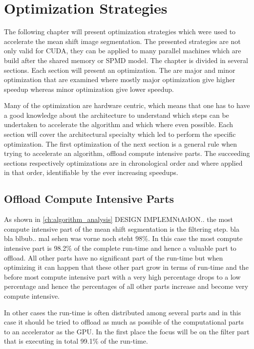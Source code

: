 \chapter{Optimization Strategies}
\label{ch:optimization}

The following chapter will present optimization strategies which were used to
accelerate the mean shift image segmentation. The presented strategies are not
only valid for \gls{CUDA}, they can be applied to many parallel machines which
are build after the shared memory or \gls{SPMD} model. The chapter is divided in
several sections. Each section will present an optimization. The are major and
minor optimization that are examined where mostly major optimization give higher
speedup whereas minor optimization give lower speedup. 

Many of the optimization are hardware centric, which means that one has to have
a good knowledge about the architecture to understand which steps can be
undertaken to accelerate the algorithm and which where even possible. Each
section will cover the architectural specialty which led to perform the specific
optimization. The first optimization of the next section is a general rule when
trying to accelerate an algorithm, offload compute intensive parts. The succeeding
sections respectively optimizations are in chronological order and where applied
in that order, identifiable by the ever increasing speedups. 


\section{Offload Compute Intensive Parts}
\label{sec:offload_intensive}

As shown in \autoref{ch:algorithm_analysis} {\color{red} DESIGN IMPLEMNtAtION..}
the most compute intensive part of the mean shift segmentation is the filtering
step. bla bla blbub.. mal sehen was vorne noch steht 98\%. In this case the most
compute intensive part is 98.2\% of the complete run-time and hence a valuable
part to offload. All other parts have no significant part of the run-time but
when optimizing it can happen that these other part grow in terms of run-time
and the before most compute intensive part with a very high percentage drops to
a low percentage and hence the percentages of all other parts increase and
become very compute intensive. 

In other cases the run-time is often distributed among several parts and in this
case it should be tried to offload as much as possible of the computational parts
to an accelerator as the \gls{GPU}. In the first place the focus will be on the
filter part that is executing in total 99.1\% of the run-time.

